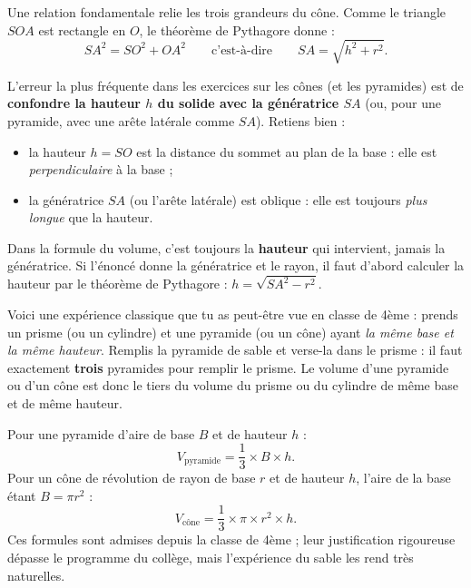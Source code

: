 \documentclass[11pt]{article}
\newcommand{\cle}[1]{{\popxbold\color{popdark}#1}}
\newcounter{popsec}
\newcounter{popsub}
\newcommand{\courssub}[1]{%
  \stepcounter{popsub}%
  \par\vspace{9pt}\noindent{\popxbold\fontsize{11.5}{13}\selectfont\color{popink}{\color{poporange}\thepopsec.\thepopsub}\hspace{6pt}#1}\par\nopagebreak\vspace{4pt}
}
\begin{document}
Une relation fondamentale relie les trois grandeurs du cône. Comme le triangle $SOA$ est rectangle en $O$, le théorème de Pythagore donne :
\[ SA^2 = SO^2 + OA^2 \qquad \text{c'est-à-dire} \qquad SA = \sqrt{h^2 + r^2}. \]

\begin{attention}
L'erreur la plus fréquente dans les exercices sur les cônes (et les pyramides) est de \textbf{confondre la hauteur $h$ du solide avec la génératrice $SA$} (ou, pour une pyramide, avec une arête latérale comme $SA$). Retiens bien :
\begin{itemize}
\item la \cle{hauteur} $h = SO$ est la distance du sommet au plan de la base : elle est \emph{perpendiculaire} à la base ;
\item la \cle{génératrice} $SA$ (ou l'arête latérale) est oblique : elle est toujours \emph{plus longue} que la hauteur.
\end{itemize}
Dans la formule du volume, c'est toujours la \textbf{hauteur} qui intervient, jamais la génératrice. Si l'énoncé donne la génératrice et le rayon, il faut d'abord calculer la hauteur par le théorème de Pythagore : $h = \sqrt{SA^2 - r^2}$.
\end{attention}

\courssub{Volumes de la pyramide et du cône}

Voici une expérience classique que tu as peut-être vue en classe de 4ème : prends un prisme (ou un cylindre) et une pyramide (ou un cône) ayant \emph{la même base et la même hauteur}. Remplis la pyramide de sable et verse-la dans le prisme : il faut exactement \textbf{trois} pyramides pour remplir le prisme. Le volume d'une pyramide ou d'un cône est donc le tiers du volume du prisme ou du cylindre de même base et de même hauteur.

\begin{propriete}
Pour une pyramide d'aire de base $B$ et de hauteur $h$ :
\[ V_{\text{pyramide}} = \dfrac{1}{3} \times B \times h. \]
Pour un cône de révolution de rayon de base $r$ et de hauteur $h$, l'aire de la base étant $B = \pi r^2$ :
\[ V_{\text{cône}} = \dfrac{1}{3} \times \pi \times r^2 \times h. \]
Ces formules sont admises depuis la classe de 4ème ; leur justification rigoureuse dépasse le programme du collège, mais l'expérience du sable les rend très naturelles.
\end{propriete}
\end{document}
